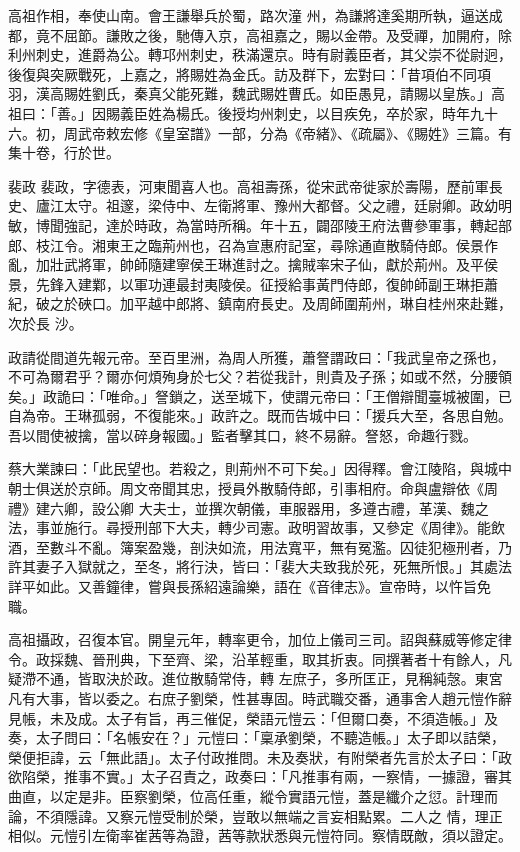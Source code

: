\begin{pinyinscope}
 高祖作相，奉使山南。會王謙舉兵於蜀，路次潼
 州，為謙將達奚期所執，逼送成都，竟不屈節。謙敗之後，馳傳入京，高祖嘉之，賜以金帶。及受禪，加開府，除利州刺史，進爵為公。轉邛州刺史，秩滿還京。時有尉義臣者，其父崇不從尉迥，後復與突厥戰死，上嘉之，將賜姓為金氏。訪及群下，宏對曰：「昔項伯不同項羽，漢高賜姓劉氏，秦真父能死難，魏武賜姓曹氏。如臣愚見，請賜以皇族。」高祖曰：「善。」因賜義臣姓為楊氏。後授均州刺史，以目疾免，卒於家，時年九十六。初，周武帝敕宏修《皇室譜》一部，分為《帝緒》、《疏屬》、《賜姓》三篇。有集十卷，行於世。



 裴政
 裴政，字德表，河東聞喜人也。高祖壽孫，從宋武帝徙家於壽陽，歷前軍長史、廬江太守。祖邃，梁侍中、左衛將軍、豫州大都督。父之禮，廷尉卿。政幼明敏，博聞強記，達於時政，為當時所稱。年十五，闢邵陵王府法曹參軍事，轉起部郎、枝江令。湘東王之臨荊州也，召為宣惠府記室，尋除通直散騎侍郎。侯景作亂，加壯武將軍，帥師隨建寧侯王琳進討之。擒賊率宋子仙，獻於荊州。及平侯景，先鋒入建鄴，以軍功連最封夷陵侯。征授給事黃門侍郎，復帥師副王琳拒蕭紀，破之於硤口。加平越中郎將、鎮南府長史。及周師圍荊州，琳自桂州來赴難，次於長
 沙。



 政請從間道先報元帝。至百里洲，為周人所獲，蕭詧謂政曰：「我武皇帝之孫也，不可為爾君乎？爾亦何煩殉身於七父？若從我計，則貴及子孫；如或不然，分腰領矣。」政詭曰：「唯命。」詧鎖之，送至城下，使謂元帝曰：「王僧辯聞臺城被圍，已自為帝。王琳孤弱，不復能來。」政許之。既而告城中曰：「援兵大至，各思自勉。吾以間使被擒，當以碎身報國。」監者擊其口，終不易辭。詧怒，命趣行戮。



 蔡大業諫曰：「此民望也。若殺之，則荊州不可下矣。」因得釋。會江陵陷，與城中朝士俱送於京師。周文帝聞其忠，授員外散騎侍郎，引事相府。命與盧辯依《周禮》建六卿，設公卿
 大夫士，並撰次朝儀，車服器用，多遵古禮，革漢、魏之法，事並施行。尋授刑部下大夫，轉少司憲。政明習故事，又參定《周律》。能飲酒，至數斗不亂。簿案盈幾，剖決如流，用法寬平，無有冤濫。囚徒犯極刑者，乃許其妻子入獄就之，至冬，將行決，皆曰：「裴大夫致我於死，死無所恨。」其處法詳平如此。又善鐘律，嘗與長孫紹遠論樂，語在《音律志》。宣帝時，以忤旨免職。



 高祖攝政，召復本官。開皇元年，轉率更令，加位上儀司三司。詔與蘇威等修定律令。政採魏、晉刑典，下至齊、梁，沿革輕重，取其折衷。同撰著者十有餘人，凡疑滯不通，皆取決於政。進位散騎常侍，轉
 左庶子，多所匡正，見稱純愨。東宮凡有大事，皆以委之。右庶子劉榮，性甚專固。時武職交番，通事舍人趙元愷作辭見帳，未及成。太子有旨，再三催促，榮語元愷云：「但爾口奏，不須造帳。」及奏，太子問曰：「名帳安在？」元愷曰：「稟承劉榮，不聽造帳。」太子即以詰榮，榮便拒諱，云「無此語」。太子付政推問。未及奏狀，有附榮者先言於太子曰：「政欲陷榮，推事不實。」太子召責之，政奏曰：「凡推事有兩，一察情，一據證，審其曲直，以定是非。臣察劉榮，位高任重，縱令實語元愷，蓋是纖介之愆。計理而論，不須隱諱。又察元愷受制於榮，豈敢以無端之言妄相點累。二人之
 情，理正相似。元愷引左衛率崔茜等為證，茜等款狀悉與元愷符同。察情既敵，須以證定。




\end{pinyinscope}
